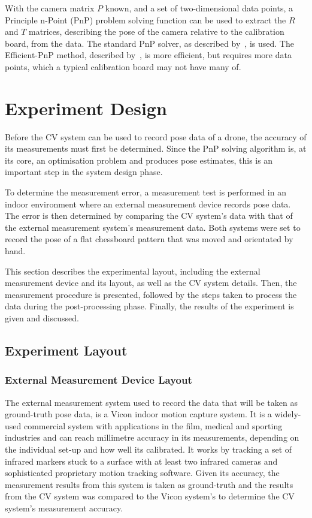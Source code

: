 With the camera matrix $P$ known, and a set of two-dimensional data points, a Principle n-Point (PnP) problem solving function can be used to extract the $R$ and $T$ matrices, describing the pose of the camera relative to the calibration board, from the data. The standard PnP solver, as described by~\cite{Schweighofer2006}, is used. The Efficient-PnP method, described by~\cite{Lepetit2008}, is more efficient, but requires more data points, which a typical calibration board may not have many of.

\section{Experiment Design}

Before the CV system can be used to record pose data of a drone, the accuracy of its measurements must first be determined. Since the PnP solving algorithm is, at its core, an optimisation problem and produces pose estimates, this is an important step in the system design phase. 

To determine the measurement error, a measurement test is performed in an indoor environment where an external measurement device records pose data. The error is then determined by comparing the CV system's data with that of the external measurement system's measurement data. Both systems were set to record the pose of a flat chessboard pattern that was moved and orientated by hand.

This section describes the experimental layout, including the external measurement device and its layout, as well as the CV system details. Then, the measurement procedure is presented, followed by the steps taken to process the data during the post-processing phase. Finally, the results of the experiment is given and discussed. 

\subsection{Experiment Layout}
\label{sec:vicon-experiment-setup}

\subsubsection{External Measurement Device Layout}

The external measurement system used to record the data that will be taken as ground-truth pose data, is a Vicon indoor motion capture system. It is a widely-used commercial system with applications in the film, medical and sporting industries and can reach millimetre accuracy in its measurements, depending on the individual set-up and how well its calibrated. It works by tracking a set of infrared markers stuck to a surface with at least two infrared cameras and sophisticated proprietary motion tracking software. Given its accuracy, the measurement results from this system is taken as ground-truth and the results from the CV system was compared to the Vicon system's to determine the CV system's measurement accuracy. 

